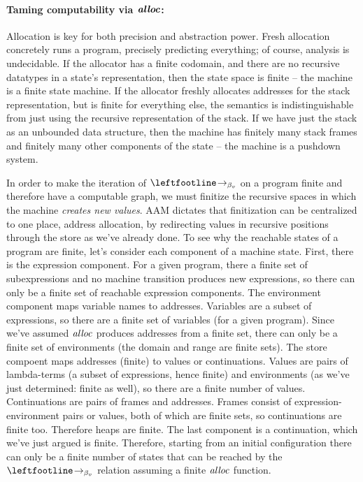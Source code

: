 \paragraph{Taming computability via \(\boldsymbol{\mathit{alloc}}\):}
Allocation is key for both precision and abstraction power.
%
Fresh allocation concretely runs a program, precisely predicting everything; of course, analysis is undecidable.
%
If the allocator has a finite codomain, and there are no recursive datatypes in a state's representation, then the state space is finite -- the machine is a finite state machine.
%
If the allocator freshly allocates addresses for the stack representation, but is finite for everything else, the semantics is indistinguishable from just using the recursive representation of the stack.
%
If we have just the stack as an unbounded data structure, then the machine has finitely many stack frames and finitely many other components of the state -- the machine is a pushdown system.


In order to make the iteration of $\betastep$ on a program finite and
therefore have a computable graph, we must finitize the recursive
spaces in which the machine \emph{creates new values}.
%
AAM dictates that finitization can be centralized to one place,
address allocation, by redirecting values in recursive positions
through the store as we've already done.
%
%
To see why the reachable states of a program are finite, let's
consider each component of a machine state.  First, there is the
expression component.  For a given program, there a finite set of
subexpressions and no machine transition produces new expressions, so
there can only be a finite set of reachable expression components.
The environment component maps variable names to addresses.  Variables
are a subset of expressions, so there are a finite set of variables
(for a given program).  Since we've assumed $\mathit{alloc}$ produces
addresses from a finite set, there can only be a finite set of
environments (the domain and range are finite sets).  The store
compoent maps addresses (finite) to values or continuations.  Values
are pairs of lambda-terms (a subset of expressions, hence finite) and
environments (as we've just determined: finite as well), so there are
a finite number of values.  Continuations are pairs of frames and
addresses.  Frames consist of expression-environment pairs or values,
both of which are finite sets, so continuations are finite too.
Therefore heaps are finite.  The last component is a continuation,
which we've just argued is finite.  Therefore, starting from an
initial configuration there can only be a finite number of states that
can be reached by the $\betastep$ relation assuming a finite $\mathit{alloc}$
function.


